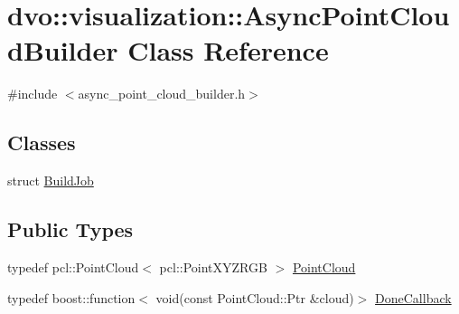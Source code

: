 \hypertarget{classdvo_1_1visualization_1_1_async_point_cloud_builder}{}\section{dvo\+:\+:visualization\+:\+:Async\+Point\+Cloud\+Builder Class Reference}
\label{classdvo_1_1visualization_1_1_async_point_cloud_builder}


{\ttfamily \#include $<$async\+\_\+point\+\_\+cloud\+\_\+builder.\+h$>$}

\subsection*{Classes}
\begin{DoxyCompactItemize}
\item 
struct \mbox{\hyperlink{structdvo_1_1visualization_1_1_async_point_cloud_builder_1_1_build_job}{Build\+Job}}
\end{DoxyCompactItemize}
\subsection*{Public Types}
\begin{DoxyCompactItemize}
\item 
typedef pcl\+::\+Point\+Cloud$<$ pcl\+::\+Point\+X\+Y\+Z\+R\+GB $>$ \mbox{\hyperlink{classdvo_1_1visualization_1_1_async_point_cloud_builder_adbe8a48427924927ac5deaaaf52fe5f3}{Point\+Cloud}}
\item 
typedef boost\+::function$<$ void(const Point\+Cloud\+::\+Ptr \&cloud)$>$ \mbox{\hyperlink{classdvo_1_1visualization_1_1_async_point_cloud_builder_aeea54b24aabbcfe12b2db923c8befc77}{Done\+Callback}}
\end{DoxyCompactItemize}
